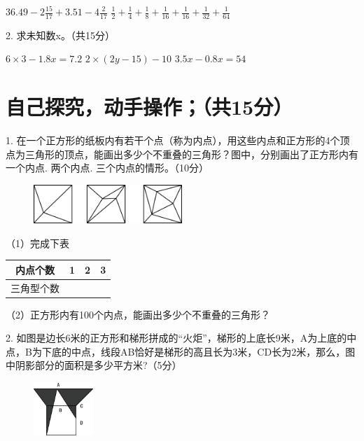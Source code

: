 \documentclass{../source/Paper}
\begin{document}
\vspace{3cm}
$\displaystyle 36.49 - 2\frac{15}{17} + 3.51 - 4\frac{2}{17}$\hspace{5cm}
$\displaystyle \frac{1}{2} + \frac{1}{4} + \frac{1}{8} + \frac{1}{16} + \frac{1}{16} + \frac{1}{32} + \frac{1}{64}$
\vspace{3cm}

2. 求未知数x。（共15分）

$6\times 3 - 1.8x=7.2$\hspace{3cm}
$2\times (2y-15)-10$\hspace{3cm}
$3.5x - 0.8x=54$

\vspace{3cm}

\section{自己探究，动手操作；（共15分）}

1. 在一个正方形的纸板内有若干个点（称为内点），用这些内点和正方形的4个顶点为三角形的顶点，能画出多少个不重叠的三角形？图中，分别画出了正方形内有一个内点. 两个内点. 三个内点的情形。（10分）
\begin{figure}[H]
    \centering
    \includegraphics[width = 0.5\textwidth]{pic/4.1.png}
\end{figure}

（1）完成下表

    \begin{table}[H]
        \centering
        \setlength{\tabcolsep}{8mm}
        {\begin{tabular}{|c|c|c|c|}
            \hline
            内点个数 & 1 & 2 & 3 \\ \hline
            三角型个数 &  &  &  \\ \hline
        \end{tabular}}
    \end{table}
    
（2）正方形内有100个内点，能画出多少个不重叠的三角形？
\vspace{3cm}

2. 如图是边长6米的正方形和梯形拼成的“火炬”，梯形的上底长9米，A为上底的中点，B为下底的中点，线段AB恰好是梯形的高且长为3米，CD长为2米，那么，图中阴影部分的面积是多少平方米?（5分）
\begin{figure}[H]
    \includegraphics[width = 0.2\textwidth]{pic/4.2.png}
\end{figure}
\end{document}
